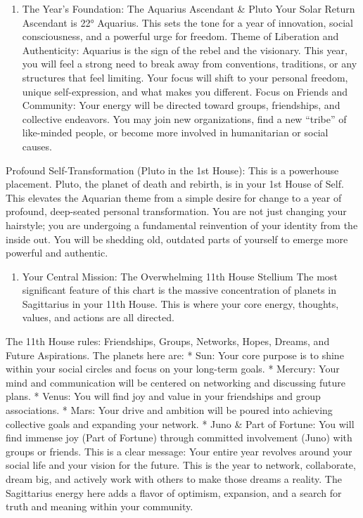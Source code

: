 \documentclass{article}
\begin{document}
\begin{enumerate}
\def\labelenumi{\arabic{enumi}.}
\tightlist
\item
  The Year's Foundation: The Aquarius Ascendant \& Pluto Your Solar
  Return Ascendant is 22° Aquarius. This sets the tone for a year of
  innovation, social consciousness, and a powerful urge for freedom.
  Theme of Liberation and Authenticity: Aquarius is the sign of the
  rebel and the visionary. This year, you will feel a strong need to
  break away from conventions, traditions, or any structures that feel
  limiting. Your focus will shift to your personal freedom, unique
  self-expression, and what makes you different. Focus on Friends and
  Community: Your energy will be directed toward groups, friendships,
  and collective endeavors. You may join new organizations, find a new
  ``tribe'' of like-minded people, or become more involved in
  humanitarian or social causes.
\end{enumerate}

Profound Self-Transformation (Pluto in the 1st House): This is a
powerhouse placement. Pluto, the planet of death and rebirth, is in your
1st House of Self. This elevates the Aquarian theme from a simple desire
for change to a year of profound, deep-seated personal transformation.
You are not just changing your hairstyle; you are undergoing a
fundamental reinvention of your identity from the inside out. You will
be shedding old, outdated parts of yourself to emerge more powerful and
authentic.

\begin{enumerate}
\def\labelenumi{\arabic{enumi}.}
\setcounter{enumi}{1}
\tightlist
\item
  Your Central Mission: The Overwhelming 11th House Stellium The most
  significant feature of this chart is the massive concentration of
  planets in Sagittarius in your 11th House. This is where your core
  energy, thoughts, values, and actions are all directed.
\end{enumerate}

The 11th House rules: Friendships, Groups, Networks, Hopes, Dreams, and
Future Aspirations. The planets here are: * Sun: Your core purpose is to
shine within your social circles and focus on your long-term goals. *
Mercury: Your mind and communication will be centered on networking and
discussing future plans. * Venus: You will find joy and value in your
friendships and group associations. * Mars: Your drive and ambition will
be poured into achieving collective goals and expanding your network. *
Juno \& Part of Fortune: You will find immense joy (Part of Fortune)
through committed involvement (Juno) with groups or friends. This is a
clear message: Your entire year revolves around your social life and
your vision for the future. This is the year to network, collaborate,
dream big, and actively work with others to make those dreams a reality.
The Sagittarius energy here adds a flavor of optimism, expansion, and a
search for truth and meaning within your community.
\end{document}

